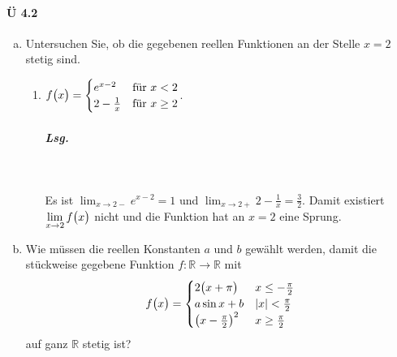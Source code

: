 \documentclass{scrreprt}
\begin{document}
\newpage
\paragraph{Ü 4.2}
\begin{enumerate}[(a)]
\item Untersuchen Sie, ob die gegebenen reellen Funktionen an der Stelle $x = 2$
  stetig sind.
  \begin{enumerate}[(1)]
  \item $f\qty\big(x) = \begin{cases}
      e^{x - 2} & \text{für } x < 2 \\
      2 - \frac{1}{x} & \text{für } x \geq 2 \\
    \end{cases}$.

    \subparagraph{Lsg.}\phantom{\null} \\

    Es ist $\displaystyle \lim_{x \to 2-} e^{x - 2} = 1$ und
    $\displaystyle \lim_{x \to 2+}2 - \frac{1}{x} = \frac{3}{2}$.
    Damit existiert $\displaystyle \lim_{x \to 2} f\qty\big(x)$ nicht und die
    Funktion hat an $x = 2$ eine Sprung.
  \end{enumerate}

\item Wie müssen die reellen Konstanten $a$ und $b$ gewählt werden, damit die
  stückweise gegebene Funktion $f \colon \mathbb{R} \to \mathbb{R}$ mit
  \[
    f\qty\big(x) = \begin{cases}
      2\qty\big(x + \pi) & x \leq -\frac{\pi}{2} \\
      a \sin x + b & \abs{x} < \frac{\pi}{2} \\
      \qty(x - \frac{\pi}{2})^2 & x \geq \frac{\pi}{2}
    \end{cases}
  \]
  auf ganz $\mathbb{R}$ stetig ist?


\end{enumerate}
\end{document}

